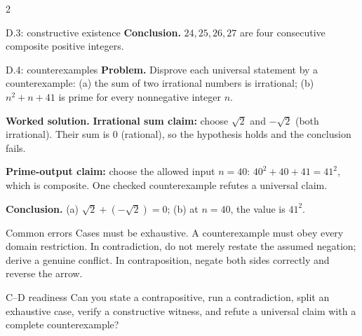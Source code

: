 \documentclass[10pt]{article}
\begin{document}
\begin{multicols}{2}
\begin{workedbox}{D.3: constructive existence}
\textbf{Conclusion.} $24,25,26,27$ are four consecutive composite positive integers.
\end{workedbox}

\begin{workedbox}{D.4: counterexamples}
\textbf{Problem.} Disprove each universal statement by a counterexample: (a) the sum of two irrational numbers is irrational; (b) $n^2+n+41$ is prime for every nonnegative integer $n$.

\textbf{Worked solution.} \textbf{Irrational sum claim:} choose $\sqrt2$ and $-\sqrt2$ (both irrational).
Their sum is $0$ (rational), so the hypothesis holds and the conclusion fails.

\textbf{Prime-output claim:} choose the allowed input $n=40$:
$40^2+40+41=41^2$, which is composite. One checked counterexample refutes a
universal claim.

\textbf{Conclusion.} (a) $\sqrt2+(-\sqrt2)=0$; (b) at $n=40$, the value is $41^2$.
\end{workedbox}

\begin{warningbox}{Common errors}
Cases must be exhaustive. A counterexample must obey every domain restriction.
In contradiction, do not merely restate the assumed negation; derive a genuine
conflict. In contraposition, negate both sides correctly and reverse the arrow.
\end{warningbox}

\begin{checklistbox}{C--D readiness}
Can you state a contrapositive, run a contradiction, split an exhaustive case,
verify a constructive witness, and refute a universal claim with a complete
counterexample?
\end{checklistbox}
\end{multicols}

\clearpage
\end{document}
